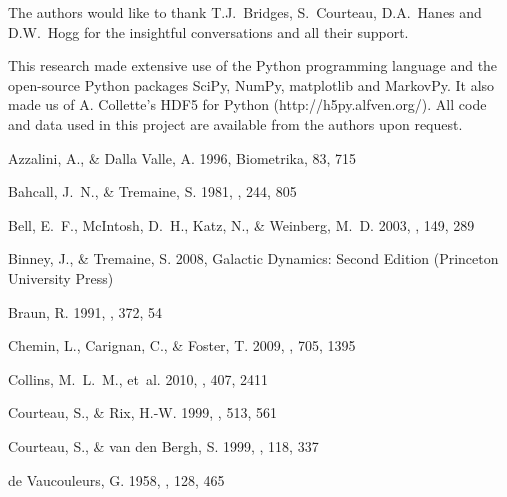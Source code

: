 \documentclass[preprint]{aastex}
\begin{document}

\acknowledgments The authors would like to thank T.J.~Bridges, S.~Courteau, D.A.~Hanes and
D.W.~Hogg for the insightful conversations and all their support.

This research made extensive use of the Python programming language and the
open-source Python packages SciPy, NumPy, matplotlib and MarkovPy.  It also
made us of A. Collette's HDF5 for Python (http://h5py.alfven.org/). All code
and data used in this project are available from the authors upon request.




\begin{thebibliography}{}

{Azzalini}, A., \& {Dalla Valle}, A. 1996, Biometrika, 83, 715

{Bahcall}, J.~N., \& {Tremaine}, S. 1981, \apj, 244, 805

{Bell}, E.~F., {McIntosh}, D.~H., {Katz}, N., \& {Weinberg}, M.~D. 2003, \apjs,
  149, 289

{Binney}, J., \& {Tremaine}, S. 2008, {Galactic Dynamics: Second Edition}
  (Princeton University Press)

{Braun}, R. 1991, \apj, 372, 54

{Chemin}, L., {Carignan}, C., \& {Foster}, T. 2009, \apj, 705, 1395

{Collins}, M.~L.~M., {et~al.} 2010, \mnras, 407, 2411

{Courteau}, S., \& {Rix}, H.-W. 1999, \apj, 513, 561

{Courteau}, S., \& {van den Bergh}, S. 1999, \aj, 118, 337

{de Vaucouleurs}, G. 1958, \apj, 128, 465


\end{thebibliography}
\end{document}
